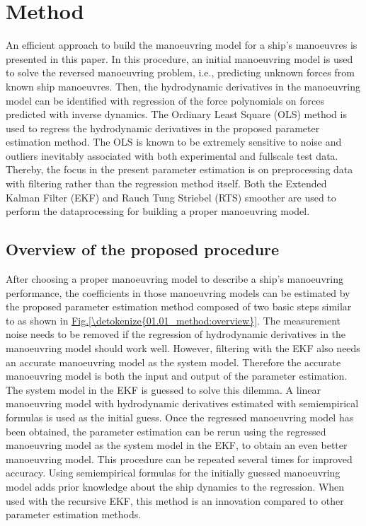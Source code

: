\documentclass[review]{elsarticle}
\begin{document}
\section{Method}
\label{\detokenize{01.01_method:method}}\label{\detokenize{01.01_method:id1}}\label{\detokenize{01.01_method::doc}}
\sphinxAtStartPar
An efficient approach to build the manoeuvring model for a ship’s manoeuvres is presented in this paper. In this procedure, an initial manoeuvring model is used to solve the reversed manoeuvring problem, i.e., predicting unknown forces from known ship manoeuvres. Then, the hydrodynamic derivatives in the manoeuvring model can be identified with regression of the force polynomials on forces predicted with inverse dynamics. The Ordinary Least Square (OLS) method is used to regress the hydrodynamic derivatives in the proposed parameter estimation method. The OLS is known to be extremely sensitive to noise and outliers inevitably associated with both experimental and full\sphinxhyphen{}scale test data. Thereby, the focus in the present parameter estimation is on pre\sphinxhyphen{}processing data with filtering rather than the regression method itself. Both the Extended Kalman Filter (EKF) and Rauch Tung Striebel (RTS) smoother are used to perform the data\sphinxhyphen{}processing for building a proper manoeuvring model.


\subsection{Overview of the proposed procedure}
\label{\detokenize{01.01_method:overview-of-the-proposed-procedure}}
\sphinxAtStartPar
After choosing a proper manoeuvring model to describe a ship’s manoeuvring performance, the coefficients in those manoeuvring models can be estimated by the proposed parameter estimation method composed of two basic steps similar to \cite{revestido_herrero_two-step_2012} as shown in \hyperref[\detokenize{01.01_method:overview}]{Fig.\@ \ref{\detokenize{01.01_method:overview}}}.
The measurement noise needs to be removed
if the regression of hydrodynamic derivatives in the manoeuvring model should work well. However, filtering with the
EKF also needs an accurate manoeuvring model as the system model. Therefore the accurate manoeuvring model is both the input and
output of the parameter estimation. The system model in the EKF is guessed to solve this dilemma. A linear manoeuvring model
with hydrodynamic derivatives estimated with semi\sphinxhyphen{}empirical formulas is used as the initial guess. Once the
regressed manoeuvring model has been obtained, the parameter estimation can be rerun using the regressed manoeuvring model as the system model
in the EKF, to obtain an even better manoeuvring model. This procedure can be repeated several times for improved
accuracy. Using semi\sphinxhyphen{}empirical formulas for the initially guessed manoeuvring model adds prior knowledge about the ship dynamics to the regression. When used with the recursive EKF, this method is an innovation compared to
other parameter estimation methods.
\end{document}
